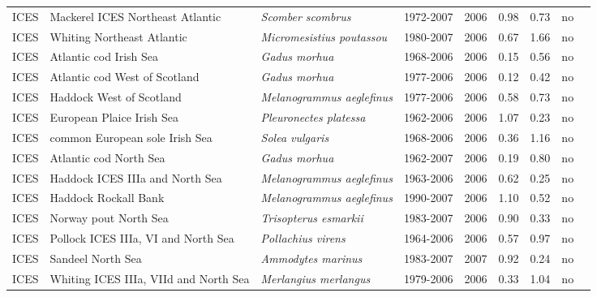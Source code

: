 \begin{longtable}{p{1.8cm}p{4cm}p{4cm}ccccp{1.9cm}c}
  ICES & Mackerel ICES Northeast Atlantic & \textit{Scomber scombrus} & 1972-2007 & 2006 & 0.98 & 0.73 & no & \cite{WGMHSA-MACKNEICES-1972-2007-JENNINGS} \\ 
  ICES & Whiting Northeast Atlantic & \textit{Micromesistius poutassou} & 1980-2007 & 2006 & 0.67 & 1.66 & no & \cite{WGNPBW-BWHITNEA-1980-2007-JENNINGS} \\ 
  ICES & Atlantic cod Irish Sea & \textit{Gadus morhua} & 1968-2006 & 2006 & 0.15 & 0.56 & no & \cite{WGNSDS-CODIS-1968-2006-MINTO} \\ 
  ICES & Atlantic cod West of Scotland & \textit{Gadus morhua} & 1977-2006 & 2006 & 0.12 & 0.42 & no & \cite{WGNSDS-CODVIa-1977-2006-MINTO} \\ 
  ICES & Haddock West of Scotland & \textit{Melanogrammus aeglefinus} & 1977-2006 & 2006 & 0.58 & 0.73 & no & \cite{WGNSDS-HADVIa-1977-2006-MINTO} \\ 
  ICES & European Plaice Irish Sea & \textit{Pleuronectes platessa} & 1962-2006 & 2006 & 1.07 & 0.23 & no & \cite{WGNSDS-PLAICIS-1962-2006-MINTO} \\ 
  ICES & common European sole Irish Sea & \textit{Solea vulgaris} & 1968-2006 & 2006 & 0.36 & 1.16 & no & \cite{WGNSDS-SOLEIS-1968-2006-MINTO} \\ 
  ICES & Atlantic cod North Sea & \textit{Gadus morhua} & 1962-2007 & 2006 & 0.19 & 0.80 & no & \cite{WGNSSK-CODNS-1962-2007-MINTO} \\ 
  ICES & Haddock ICES IIIa and North Sea & \textit{Melanogrammus aeglefinus} & 1963-2006 & 2006 & 0.62 & 0.25 & no & \cite{WGNSSK-HADNS-IIIa-1963-2006-MINTO} \\ 
  ICES & Haddock Rockall Bank & \textit{Melanogrammus aeglefinus} & 1990-2007 & 2006 & 1.10 & 0.52 & no & \cite{WGNSSK-HADROCK-1990-2007-JENNINGS} \\ 
  ICES & Norway pout North Sea & \textit{Trisopterus esmarkii} & 1983-2007 & 2006 & 0.90 & 0.33 & no & \cite{WGNSSK-NPOUTNS-1983-2007-MINTO} \\ 
  ICES & Pollock ICES IIIa, VI and North Sea & \textit{Pollachius virens} & 1964-2006 & 2006 & 0.57 & 0.97 & no & \cite{WGNSSK-POLLNS-VI-IIIa-1964-2006-MINTO} \\ 
  ICES & Sandeel North Sea & \textit{Ammodytes marinus} & 1983-2007 & 2007 & 0.92 & 0.24 & no & \cite{WGNSSK-SEELNS-1983-2007-MINTO} \\ 
  ICES & Whiting ICES IIIa, VIId and North Sea & \textit{Merlangius merlangus} & 1979-2006 & 2006 & 0.33 & 1.04 & no & \cite{WGNSSK-WHITNS-VIId-IIIa-1979-2006-MINTO} \\ 

\end{longtable}
